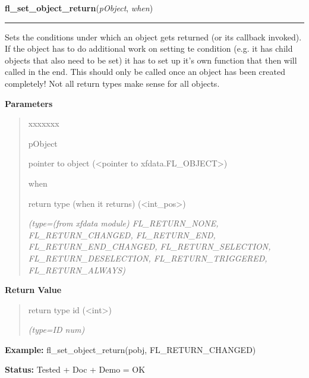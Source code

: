 \hspace{.8\funcindent}\begin{boxedminipage}{\funcwidth}

    \raggedright \textbf{fl\_set\_object\_return}(\textit{pObject}, \textit{when})

    \vspace{-1.5ex}

    \rule{\textwidth}{0.5\fboxrule}
\setlength{\parskip}{2ex}
    Sets the conditions under which an object gets returned (or its 
    callback invoked). If the object has to do additional work on setting 
    te condition (e.g. it has child objects that also need to be set) it 
    has to set up it's own function that then will called in the end. This 
    should only be called once an object has been created completely! Not 
    all return types make sense for all objects.

\setlength{\parskip}{1ex}
      \textbf{Parameters}
      \vspace{-1ex}

      \begin{quote}
        \begin{Ventry}{xxxxxxx}

          \item[pObject]

          pointer to object ({\textless}pointer to 
          xfdata.FL\_OBJECT{\textgreater})

          \item[when]

          return type (when it returns) ({\textless}int\_pos{\textgreater})

            {\it (type=(from xfdata module) FL\_RETURN\_NONE, FL\_RETURN\_CHANGED, 
FL\_RETURN\_END, FL\_RETURN\_END\_CHANGED, FL\_RETURN\_SELECTION, 
FL\_RETURN\_DESELECTION, FL\_RETURN\_TRIGGERED, FL\_RETURN\_ALWAYS)}

        \end{Ventry}

      \end{quote}

      \textbf{Return Value}
    \vspace{-1ex}

      \begin{quote}
      return type id ({\textless}int{\textgreater})

      {\it (type=ID num)}

      \end{quote}

\textbf{Example:} fl\_set\_object\_return(pobj, FL\_RETURN\_CHANGED)



\textbf{Status:} Tested + Doc + Demo = OK



    \end{boxedminipage}

